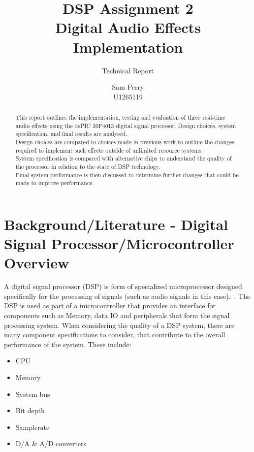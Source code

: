 \documentclass{scrartcl}
\begin{document}
    \title{DSP Assignment 2\\Digital Audio Effects Implementation}
    \subtitle{Technical Report}
    \author{Sam Perry\\U1265119}
    \date{}
    \maketitle

    \begin{abstract}
        This report outlines the implementation, testing and evaluation of
        three real-time audio effects using the dsPIC 30F4013 digital signal
        processor.  Design choices, system specification, and final results
        are analysed.\\
        Design choices are compared to choices made in previous work to outline
        the changes required to implement such effects outside of
        unlimited resource systems.\\
        System specification is compared with alternative chips to understand
        the quality of the processor in relation to the state of DSP
        technology.\\
        Final system performance is then discussed to determine further
        changes that could be made to improve performance.
    \end{abstract}

    \section{Background/Literature - Digital Signal Processor/Microcontroller
    Overview}
    A digital signal processor (DSP) is form of specialized microprocessor
    designed specifically for the processing of signals (such as audio signals
    in this case).~\parencite[p.11-12]{libtak2006ieh}. The DSP is used as part
    of a microcontroller that provides an interface for components such as
    Memory, data IO and peripherals that form the signal processing system.
    When considering the quality of a DSP system, there are many component
    specifications to consider, that contribute to the overall performance of
    the system. These include:
    \begin{itemize}
        \item CPU
        \item Memory
        \item System bus
        \item Bit depth
        \item Samplerate
        \item D/A \& A/D converters
    \end{itemize}
\end{document}

